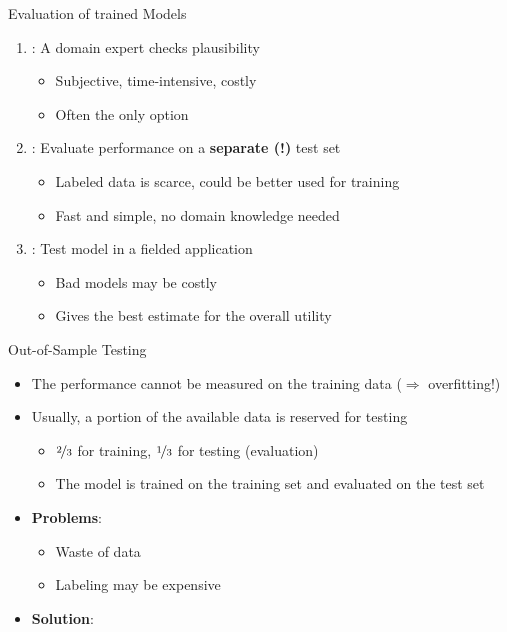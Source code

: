 \begin{frame}{Evaluation of trained Models}{}
	\begin{enumerate}
		\item {}: A domain expert checks plausibility
		\begin{itemize}
			\item Subjective, time-intensive, costly
			\item Often the only option
		\end{itemize}
		\item {}: Evaluate performance on a \textbf{separate (!)} test set
		\begin{itemize}
			\item Labeled data is scarce, could be better used for training
			\item Fast and simple, no domain knowledge needed
		\end{itemize}
		\item {}: Test model in a fielded application
		\begin{itemize}
			\item Bad models may be costly
			\item Gives the best estimate for the overall utility
		\end{itemize}
	\end{enumerate}
\end{frame}


\begin{frame}{Out-of-Sample Testing}{}\important
	\begin{itemize}
		\item The performance cannot be measured on the training data ($\Rightarrow$ overfitting!)
		\item Usually, a portion of the available data is reserved for testing
		\begin{itemize}
			\item $\nicefrac{2}{3}$ for training, $\nicefrac{1}{3}$ for testing (evaluation)
			\item The model is trained on the training set and evaluated on the test set
		\end{itemize}
		\item \textbf{Problems}:
		\begin{itemize}
			\item Waste of data
			\item Labeling may be expensive
		\end{itemize}
		\item \textbf{Solution}: 
	\end{itemize}
\end{frame}


